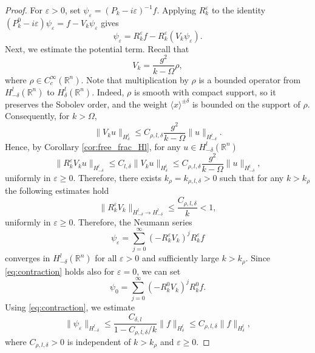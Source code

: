 \documentclass[12pt,a4paper]{amsart}
\numberwithin{equation}{section}
\theoremstyle{plain}
\theoremstyle{definition}
\begin{document}
\begin{proof}
    For $\varepsilon >0$, set $\psi_\varepsilon = (P_k - i\varepsilon)^{-1}f$. Applying $R_k^\varepsilon$ to the identity $(P_k^0 - i\varepsilon)\psi_\varepsilon = f - V_k\psi_\varepsilon$ gives
    \begin{equation*}
        \psi_\varepsilon = R_k^\varepsilon f - R_k^\varepsilon(V_k\psi_\varepsilon).
    \end{equation*}
    Next, we estimate the potential term. Recall that
    \begin{equation*}
        V_k = \frac{g^2}{k - \Omega}\rho,
    \end{equation*}
    where $\rho \in C_c^\infty(\mathbb{R}^n)$. Note that multiplication by $\rho$ is a bounded operator from $H^l_{-\delta}(\mathbb{R}^n)$ to $H^l_\delta(\mathbb{R}^n)$. Indeed, $\rho$ is smooth with compact support, so it preserves the Sobolev order, and the weight $\langle x\rangle^{\pm\delta}$ is bounded on the support of $\rho$. Consequently, for $k>\Omega$,
    \begin{equation}\label{eq:Vk_bound}
    \|V_k u\|_{H^l_\delta}
    \leq
    C_{\rho,l,\delta} \frac{g^2 }{k - \Omega}
    \|u\|_{H^l_{-\delta}}.
    \end{equation}
    Hence, by Corollary \ref{cor:free_frac_Hl}, for any $u\in H^l_{-\delta}(\mathbb{R}^n)$
    \begin{equation*}
         \|R_k^\varepsilon V_k u \|_{H^l_{-\delta}}\leq C_{l,\delta} \|V_k u\|_{H^l_\delta} \leq C_{\rho,l,\delta} \frac{g^2 }{k - \Omega}
    \|u\|_{H^l_{-\delta}},
    \end{equation*}
    uniformly in $\varepsilon \geq 0$. Therefore, there exists $k_\rho = k_{\rho,l,\delta} >0$ such that for any $k>k_{\rho}$ the following estimates hold
    \begin{equation}\label{eq:contraction}
        \|R_k^\varepsilon V_k\|_{H^l_{-\delta} \to H^l_{-\delta}}
        \leq
        \frac{C_{\rho,l,\delta} }{k} < 1,
    \end{equation}
    uniformly in $\varepsilon\geq 0$. Therefore, the Neumann series
    \begin{equation}\label{eq:Neumann}
    \psi_\varepsilon
    =
    \sum_{j=0}^\infty (-R_k^\varepsilon V_k)^j R_k^\varepsilon f
    \end{equation}
    converges in $H^l_{-\delta}(\mathbb{R}^n)$ for all $\varepsilon>0$ and sufficiently large $k>k_\rho$. Since \eqref{eq:contraction} holds also for $\varepsilon=0$, we can set 
    \begin{equation*}
    \psi_0
    =
    \sum_{j=0}^\infty (-R_k^0 V_k)^j R_k^0 f.
    \end{equation*}
    Using \eqref{eq:contraction}, we estimate
    \begin{equation}\label{eq:uniform_est}
        \|\psi_\varepsilon\|_{H^l_{-\delta}}
        \leq
        \frac{C_{\delta,l}}{1 - C_{\rho,l,\delta}/k}
        \|f\|_{H^l_\delta}
        \leq
        C_{\rho,l,\delta} \|f\|_{H^l_\delta},
    \end{equation}
    where $C_{\rho,l,\delta}>0$ is independent of $k > k_\rho$ and $\varepsilon\geq 0$.


\end{proof}
\end{document}
